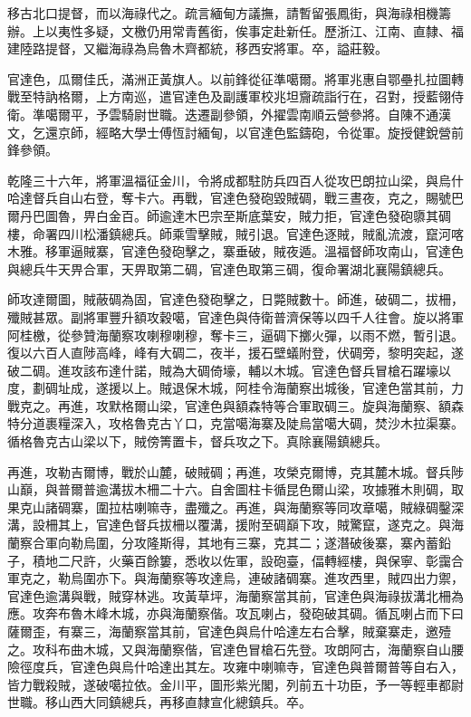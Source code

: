 \begin{pinyinscope}
移古北口提督，而以海祿代之。疏言緬甸方議撫，請暫留張鳳街，與海祿相機籌辦。上以夷性多疑，文檄仍用常青舊銜，俟事定赴新任。歷浙江、江南、直隸、福建陸路提督，又繼海祿為烏魯木齊都統，移西安將軍。卒，謚莊毅。

官達色，瓜爾佳氏，滿洲正黃旗人。以前鋒從征準噶爾。將軍兆惠自鄂壘扎拉圖轉戰至特訥格爾，上方南巡，遣官達色及副護軍校兆坦齎疏詣行在，召對，授藍翎侍衛。準噶爾平，予雲騎尉世職。迭遷副參領，外擢雲南順云營參將。自陳不通漢文，乞還京師，經略大學士傅恆討緬甸，以官達色監鑄砲，令從軍。旋授健銳營前鋒參領。

乾隆三十六年，將軍溫福征金川，令將成都駐防兵四百人從攻巴朗拉山梁，與烏什哈達督兵自山右登，奪卡六。再戰，官達色發砲毀賊碉，戰三晝夜，克之，賜號巴爾丹巴圖魯，畀白金百。師逾達木巴宗至斯底葉安，賊力拒，官達色發砲隳其碉樓，命署四川松潘鎮總兵。師乘雪擊賊，賊引退。官達色逐賊，賊亂流渡，竄河喀木雅。移軍逼賊寨，官達色發砲擊之，寨垂破，賊夜遁。溫福督師攻南山，官達色與總兵牛天畀合軍，天畀取第二碉，官達色取第三碉，復命署湖北襄陽鎮總兵。

師攻達爾圖，賊蔽碉為固，官達色發砲擊之，日斃賊數十。師進，破碉二，拔柵，殲賊甚眾。副將軍豐升額攻穀噶，官達色與侍衛普濟保等以四千人往會。旋以將軍阿桂檄，從參贊海蘭察攻喇穆喇穆，奪卡三，逼碉下擲火彈，以雨不燃，暫引退。復以六百人直陟高峰，峰有大碉二，夜半，援石壁蟻附登，伏碉旁，黎明突起，遂破二碉。進攻該布達什諾，賊為大碉倚壕，輔以木城。官達色督兵冒槍石躍壕以度，劃碉址成，遂援以上。賊退保木城，阿桂令海蘭察出城後，官達色當其前，力戰克之。再進，攻默格爾山梁，官達色與額森特等合軍取碉三。旋與海蘭察、額森特分道裹糧深入，攻格魯克古丫口，克當噶海寨及陡烏當噶大碉，焚沙木拉渠寨。循格魯克古山梁以下，賊傍箐置卡，督兵攻之下。真除襄陽鎮總兵。

再進，攻勒吉爾博，戰於山麓，破賊碉；再進，攻榮克爾博，克其麓木城。督兵陟山巔，與普爾普逾溝拔木柵二十六。自舍圖柱卡循昆色爾山梁，攻據雅木則碉，取果克山諸碉寨，圍拉枯喇嘛寺，盡殲之。再進，與海蘭察等同攻章噶，賊綠碉鑿深溝，設柵其上，官達色督兵拔柵以覆溝，援附至碉巔下攻，賊驚竄，遂克之。與海蘭察合軍向勒烏圍，分攻隆斯得，其地有三寨，克其二；遂潛破後寨，寨內蓄鉛子，積地二尺許，火藥百餘簍，悉收以佐軍，設砲臺，偪轉經樓，與保寧、彰靄合軍克之，勒烏圍亦下。與海蘭察等攻達烏，連破諸碉寨。進攻西里，賊四出力禦，官達色逾溝與戰，賊穿林逃。攻黃草坪，海蘭察當其前，官達色與海祿拔溝北柵為應。攻奔布魯木峰木城，亦與海蘭察偕。攻瓦喇占，發砲破其碉。循瓦喇占而下曰薩爾歪，有寨三，海蘭察當其前，官達色與烏什哈達左右合擊，賊棄寨走，邀殪之。攻科布曲木城，又與海蘭察偕，官達色冒槍石先登。攻朗阿古，海蘭察自山腰險徑度兵，官達色與烏什哈達出其左。攻雍中喇嘛寺，官達色與普爾普等自右入，皆力戰殺賊，遂破噶拉依。金川平，圖形紫光閣，列前五十功臣，予一等輕車都尉世職。移山西大同鎮總兵，再移直隸宣化總鎮兵。卒。


\end{pinyinscope}

